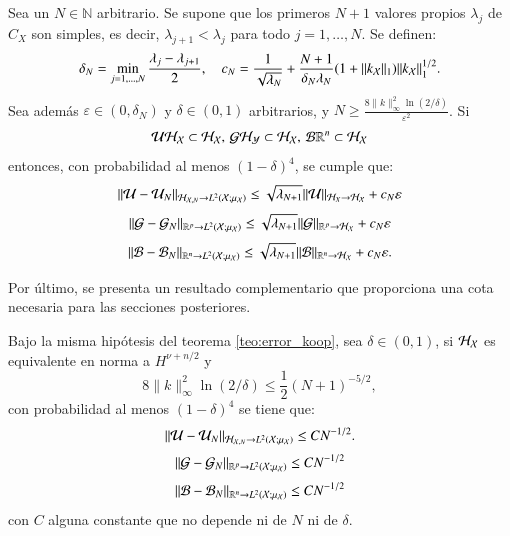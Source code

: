 \begin{teo}
    Sea un \( N \in \mathbb{N} \) arbitrario. Se supone que los primeros \( N + 1 \) valores propios \( \lambda_j \) de \( C_X \) son simples, es decir, \( \lambda_{j+1} < \lambda_j \) para todo \( j = 1, \ldots, N \). Se definen:
    \[
    \delta_N = \min_{j=1, \ldots, N} \frac{\lambda_j - \lambda_{j+1}}{2}, \quad c_N = \frac{1}{\sqrt{\lambda_N}} + \frac{N + 1}{\delta_N \lambda_N} (1 + \|k_{\mathcal{X}}\|_{1}) \|k_{\mathcal{X}} \|^{1/2}_{1}.
    \]
    Sea además \( \varepsilon \in (0, \delta_N) \) y \( \delta \in (0, 1) \) arbitrarios, y \( N \geq  \frac{8\|k\|^2_\infty \ln(2/\delta)}{\varepsilon^2} \). Si 
    \begin{equation*}
        \mathcal{U} \mathcal{H}_{\mathcal{X}} \subset \mathcal{H}_{\mathcal{X}}, \, \mathcal{G} \mathcal{H}_{\mathcal{Y}} \subset \mathcal{H}_{\mathcal{X}}, \, \mathcal{B} \mathbb{R}^n \subset \mathcal{H}_{\mathcal{X}}
    \end{equation*}
    entonces, con probabilidad al menos \( (1 - \delta)^4 \), se cumple que:
    \[
    \|\mathcal{U} - \mathcal{U}_N \|_{\mathcal{H}_{\mathcal{X}, N} \to L^2(\mathcal{X}; \mu_{\mathcal{X}})} \leq \sqrt{\lambda_{N+1}} \|\mathcal{U} \|_{\mathcal{H}_{X} \to \mathcal{H_{\mathcal{X}}}} + c_N \varepsilon
    \]
    \[
    \|\mathcal{G} - \mathcal{G}_N \|_{\mathbb{R}^p \to L^2(\mathcal{X}; \mu_{\mathcal{X}})} \leq \sqrt{\lambda_{N+1}} \|\mathcal{G} \|_{\mathbb{R}^p \to \mathcal{H_{\mathcal{X}}}} + c_N \varepsilon
    \]
    \[
    \|\mathcal{B} - \mathcal{B}_N \|_{\mathbb{R}^n \to L^2(\mathcal{X}; \mu_{\mathcal{X}})} \leq \sqrt{\lambda_{N+1}} \|\mathcal{B} \|_{\mathbb{R}^n \to \mathcal{H_{\mathcal{X}}}} + c_N \varepsilon.
    \]
    \label{teo:error_koop}
\end{teo}

Por último, se presenta un resultado complementario que proporciona una cota necesaria para las secciones posteriores.

\begin{teo}
    Bajo la misma hipótesis del teorema \ref{teo:error_koop}, sea $\delta \in (0, 1)$,  si $\mathcal{H}_{\mathcal{X}}$ es equivalente en norma a $H^{\nu + n/2}$ y
    \[
    8\|k\|^2_\infty \ln(2/\delta) \leq \frac{1}{2} (N+1)^{-5/2},
    \]
    con probabilidad al menos $(1 - \delta)^4$ se tiene que:
    \begin{equation}
        \| \mathcal{U} - \mathcal{U}_N \|_{\mathcal{H}_{\mathcal{X}, N} \to L^2(\mathcal{X}; \mu_{\mathcal{X}})} \leq C N^{-1/2}.
        \label{eq:kEDMD_bound}
    \end{equation}
    \begin{equation*}
    \| \mathcal{G} - \mathcal{G}_N \|_{\mathbb{R}^p \to L^2(\mathcal{X}; \mu_{\mathcal{X}})} \leq C N^{-1/2}
    \end{equation*}
    \begin{equation*}
    \| \mathcal{B} - \mathcal{B}_N \|_{\mathbb{R}^n \to L^2(\mathcal{X}; \mu_{\mathcal{X}})} \leq C N^{-1/2}
    \end{equation*}
    con $C$ alguna constante que no depende ni de $N$ ni de $\delta$.
    \label{teo:error_koop_sqrt_N_hip}
\end{teo}

